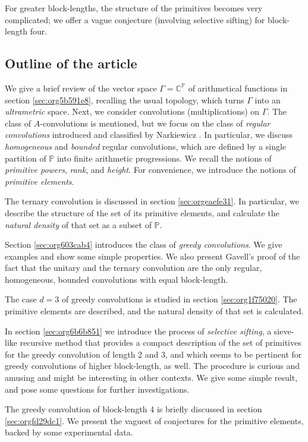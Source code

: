 \documentclass[12pt]{article}
\theoremstyle{definition}
\theoremstyle{remark}
\theoremstyle{plain}
\newcommand{\NNp}{{\mathbb{P}}}
\newcommand{\CC}{{\mathbb{C}}}
\begin{document}
For greater block-lengths, the structure of the primitives becomes very complicated;
we offer a vague conjecture (involving selective sifting) for block-length four.
\subsection{Outline of the article}
\label{sec:orgc5989c6}
We give a brief review of the vector space \(\Gamma = \CC^{\NNp}\) of arithmetical functions in section
\ref{sec:org5b591e8}, recalling the usual topology,
which turns \(\Gamma\) into an \emph{ultrametric} space.
Next, we consider convolutions (multiplications) on \(\Gamma\).
The class of \(A\)-convolutions \cite{BurnettGeneralAfunctions} is
mentioned, but we focus on the class of \emph{regular convolutions} introduced and classified
by Narkiewicz \cite{Nark:conv}. In particular, we discuss \emph{homogeneous} and \emph{bounded}
regular convolutions, which are defined by a single partition of \(\NNp\) into
finite arithmetic progressions. We recall the notions of \emph{primitive powers}, \emph{rank}, and \emph{height}.
For convenience, we introduce the notions of \emph{primitive elements}.

The ternary convolution is discussed in section \ref{sec:orgeaefe31}. In particular,
we describe the structure of the set of its primitive elements, and  calculate
the \emph{natural density} of that set as a subset of \(\NNp\).

Section \ref{sec:org603cab4} introduces the class of \emph{greedy convolutions}. We give examples
and show some simple properties. We also present Gavell's \cite{Gavell:Regular} proof
of the fact that the unitary and the ternary convolution are the only regular, homogeneous,
bounded convolutions with equal block-length.

The case \(d=3\) of greedy convolutions is studied in section \ref{sec:org1f75020}.
The primitive elements are described, and the natural density of that set is calculated.

In section \ref{sec:org6b6b851} we introduce the process of \emph{selective sifting}, a sieve-like
recursive method that provides a compact description of the set of primitives for the
greedy convolution of length 2 and 3, and which seems to be pertinent for greedy convolutions
of higher block-length, as well. The procedure is curious and amusing and might be interesting
in other contexts. We give some simple result, and pose some questions for further investigations.

The greedy convolution of block-length 4 is briefly discussed in
section \ref{sec:orgfd29dc1}. We present the vaguest of conjectures for
the primitive elements, backed by some experimental data.
\end{document}
